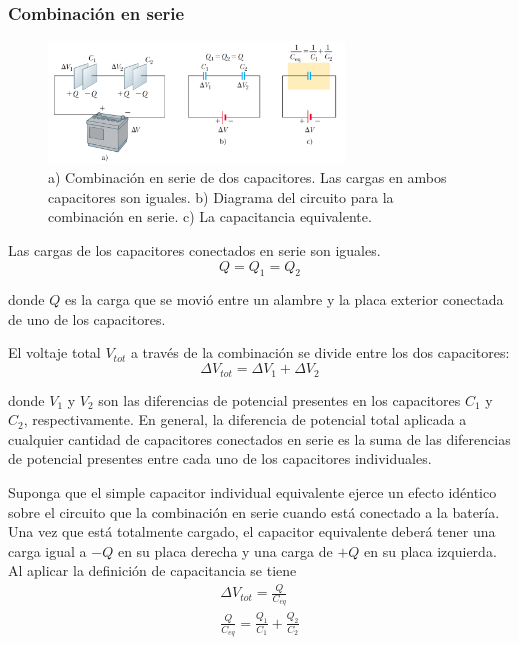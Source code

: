     \subsubsection{Combinación en serie}
      \begin{figure}[H]
      \centering
        \includegraphics[width=0.7\textwidth]{4/figure_7}
        \caption{a) Combinación en serie de dos capacitores. Las cargas en ambos capacitores son iguales. b) Diagrama
        del circuito para la combinación en serie. c) La capacitancia equivalente.}
      \end{figure}

      \PN Las cargas de los capacitores conectados en serie son iguales.
      \begin{equation*}
        Q = Q_{1} = Q_{2}
      \end{equation*}

      \PN donde $Q$ es la carga que se movió entre un alambre y la placa exterior conectada de uno de los capacitores.

      \PN El voltaje total $V_{tot}$ a través de la combinación se divide entre los dos capacitores:
      \begin{equation*}
        \Delta V_{tot} = \Delta V_{1} + \Delta V_{2}
      \end{equation*}

      \PN donde $V_{1}$ y $V_{2}$ son las diferencias de potencial presentes en los capacitores $C_{1}$ y $C_{2}$,
      respectivamente. En general, la diferencia de potencial total aplicada a cualquier cantidad de capacitores
      conectados en serie es la suma de las diferencias de potencial presentes entre cada uno de los capacitores
      individuales.

      \VS
      \PN Suponga que el simple capacitor individual equivalente ejerce un efecto idéntico sobre el circuito que la
      combinación en serie cuando está conectado a la batería. Una vez que está totalmente cargado, el capacitor
      equivalente deberá tener una carga igual a $-Q$ en su placa derecha y una carga de $+Q$ en su placa izquierda. Al
      aplicar la definición de capacitancia se tiene
      \begin{eqnarray*}
        \Delta V_{tot} = \frac{Q}{C_{eq}} \\
        \frac{Q}{C_{eq}} = \frac{Q_{1}}{C_{1}} + \frac{Q_{2}}{C_{2}}
      \end{eqnarray*}

